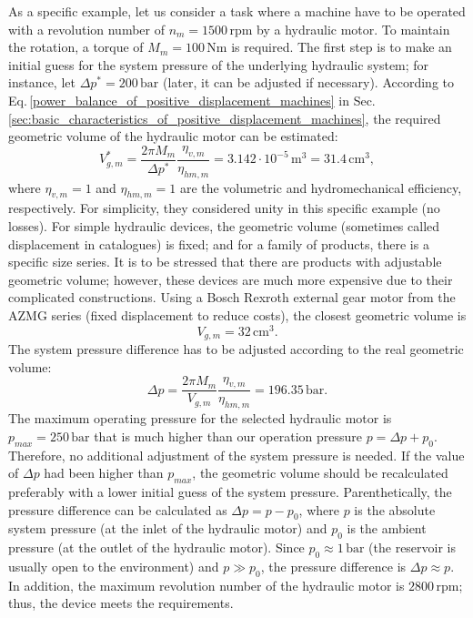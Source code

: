 As a specific example, let us consider a task where a machine have to be operated with a revolution number of $n_m=1500\,\mathrm{rpm}$ by a hydraulic motor. To maintain the rotation, a torque of $M_m=100\,\mathrm{Nm}$ is required. The first step is to make an initial guess for the system pressure of the underlying hydraulic system; for instance, let $\Delta p^*=200\,\mathrm{bar}$ (later, it can be adjusted if necessary). According to Eq.\,\eqref{power_balance_of_positive_displacement_machines} in Sec.\,\ref{sec:basic_characteristics_of_positive_displacement_machines}, the required geometric volume of the hydraulic motor can be estimated:
%
\begin{equation}
V_{g,m}^* = \frac{2 \pi M_m}{\Delta p^*} \frac{\eta_{v,m}}{\eta_{hm,m}} = 3.142 \cdot 10^{-5}\,\mathrm{m^3} = 31.4\,\mathrm{cm^3},
\end{equation}
%
where $\eta_{v,m}=1$ and $\eta_{hm,m}=1$ are the volumetric and hydromechanical efficiency, respectively. For simplicity, they considered unity in this specific example (no losses). For simple hydraulic devices, the geometric volume (sometimes called displacement in catalogues) is fixed; and for a family of products, there is a specific size series. It is to be stressed that there are products with adjustable geometric volume; however, these devices are much more expensive due to their complicated constructions. Using a Bosch Rexroth external gear motor from the AZMG series (fixed displacement to reduce costs), the closest geometric volume is
%
\begin{equation}
V_{g,m}=32\,\mathrm{cm^3}.
\end{equation}
%
The system pressure difference has to be adjusted according to the real geometric volume:
%
\begin{equation}
\Delta p = \frac{2 \pi M_m}{V_{g,m}} \frac{\eta_{v,m}}{\eta_{hm,m}} = 196.35\,\mathrm{bar}.
\end{equation}
%
The maximum operating pressure for the selected hydraulic motor is $p_{max}=250\,\mathrm{bar}$ that is much higher than our operation pressure $p=\Delta p + p_0$. Therefore, no additional adjustment of the system pressure is needed. If the value of $\Delta p$ had been higher than $p_{max}$, the geometric volume should be recalculated preferably with a lower initial guess of the system pressure. Parenthetically, the pressure difference can be calculated as $\Delta p=p-p_0$, where $p$ is the absolute system pressure (at the inlet of the hydraulic motor) and $p_0$ is the ambient pressure (at the outlet of the hydraulic motor). Since $p_0 \approx 1\,\mathrm{bar}$ (the reservoir is usually open to the environment) and $p \gg p_0$, the pressure difference is $\Delta p \approx p$. In addition, the maximum revolution number of the hydraulic motor is $2800\,\mathrm{rpm}$; thus, the device meets the requirements.

